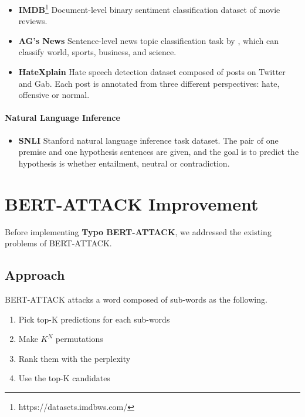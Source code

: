 \documentclass[11pt,a4paper]{article}
\begin{document}
\begin{itemize}
    \item \textbf{IMDB}\footnote{https://datasets.imdbws.com/} Document-level binary sentiment classification dataset of movie reviews. 
    \item \textbf{AG’s News} Sentence-level news topic classification task by \citet{AG_news}, which can classify world, sports, business, and science. 
    \item \textbf{HateXplain} \citep{HateXplain} Hate speech detection dataset composed of posts on Twitter and Gab. Each post is annotated from three different perspectives: hate, offensive or normal. 
\end{itemize}

\paragraph{Natural Language Inference}

\begin{itemize}
    \item \textbf{SNLI} \citep{SNLI} Stanford natural language inference task dataset. The pair of one premise and one hypothesis sentences are given, and the goal is to predict the hypothesis is whether entailment, neutral or contradiction.
\end{itemize}

\section{BERT-ATTACK Improvement}
\label{sec:BERT-ATTACK Improvement}

Before implementing \textbf{Typo BERT-ATTACK}, we addressed the existing problems of BERT-ATTACK. 

\subsection{Approach}
\label{Improvement:Approach}

BERT-ATTACK attacks a word composed of sub-words as the following. 

\begin{enumerate}
\item Pick top-K predictions for each sub-words
\item Make $K^N$ permutations 
\item Rank them with the perplexity 
\item Use the top-K candidates
\end{enumerate}
 
\end{document}
